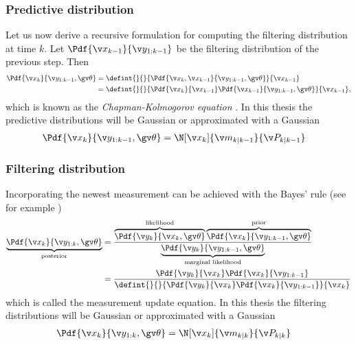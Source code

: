 \subsubsection*{Predictive distribution}
Let us now derive a recursive formulation for computing the filtering distribution at time $k$. Let $\Pdf{\xkk}{\y_{1:k-1}}$
be the filtering distribution of the previous step. Then 
\begin{align}
	\Pdf{\xk}{\y_{1:k-1},\Th}&=\defint{}{}{\Pdf{\xk,\xkk}{\y_{1:k-1},\Th}}{\xkk} \nonumber\\
	&=\defint{}{}{\Pdf{\xk}{\xkk}\Pdf{\xkk}{\y_{1:k-1},\Th}}{\xkk},
	\label{eq:pred_bayes}
\end{align}
which is known as the \emph{Chapman-Kolmogorov equation} \parencite{Sarkka2006}.
In this thesis the predictive distributions will be Gaussian or approximated with a Gaussian
\begin{align}
	\Pdf{\xk}{\y_{1:k-1},\Th}&=\N[\xk]{\m_{k|k-1}}{\P_{k|k-1}}
\end{align}

\subsubsection*{Filtering distribution}
Incorporating the newest measurement can be achieved with the Bayes'
rule (see for example \cite{gelman2004})
\begin{align}
	\underbrace{\Pdf{\xk}{\y_{1:k},\Th}}_\text{posterior}&=\frac{\overbrace{\Pdf{\yk}{\xk,\Th}}^\text{likelihood}\overbrace{\Pdf{\xk}{\y_{1:k-1},\Th}}^\text{prior}}{\underbrace{\Pdf{\y_{k}}{\y_{1:k-1},\Th}}_\text{marginal likelihood}}\nonumber\\
	&=\frac{\Pdf{\yk}{\xk}\Pdf{\xk}{\y_{1:k-1}}}{\defint{}{}{\Pdf{\yk}{\xk}\Pdf{\xk}{\y_{1:k-1}}}{\xk}}
	\label{eq:filt_bayes}
\end{align}
which is called the measurement update equation.
In this thesis the filtering distributions will be Gaussian or approximated with a Gaussian
\begin{align}
	\Pdf{\xk}{\y_{1:k},\Th}&=\N[\xk]{\m_{k|k}}{\P_{k|k}}
\end{align}


